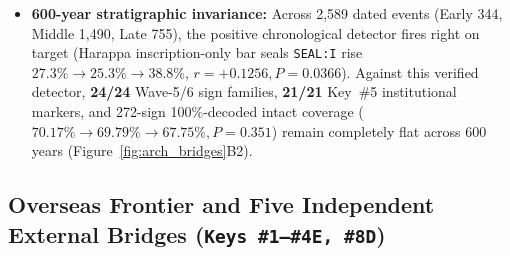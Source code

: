 \documentclass[11pt,a4paper]{article}
\begin{document}
\begin{itemize}
  \item \textbf{600-year stratigraphic invariance:} Across 2,589 dated events (Early 344, Middle 1,490, Late 755), the positive chronological detector fires right on target (Harappa inscription-only bar seals \texttt{SEAL:I} rise $27.3\% \to 25.3\% \to 38.8\%$, $r = +0.1256, P = 0.0366$). Against this verified detector, \textbf{24/24} Wave-5/6 sign families, \textbf{21/21} Key~\#5 institutional markers, and 272-sign 100\%-decoded intact coverage ($70.17\% \to 69.79\% \to 67.75\%, P = 0.351$) remain completely flat across 600 years (Figure~\ref{fig:arch_bridges}B2).
\end{itemize}

\subsection{Overseas Frontier and Five Independent External Bridges (\texttt{Keys \#1--\#4E, \#8D})}
\end{document}
